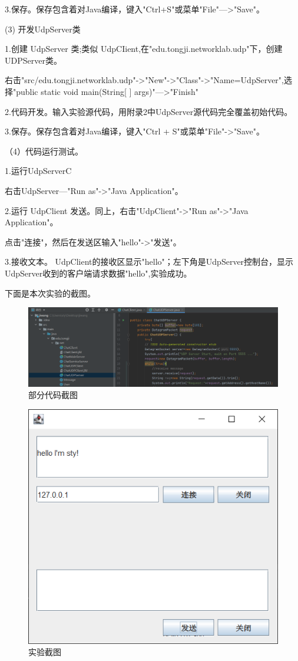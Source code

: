 \documentclass[lang=cn,11pt,a4paper,cite=authoryear]{elegantpaper}
\begin{document}
	3.保存。保存包含着对Java编译，键入"Ctrl+S"或菜单"File"—>"Save"。

(3)	开发UdpServer类

	1.创建 UdpServer 类;类似 UdpCIient,在"edu.tongji.networklab.udp"下，创建 UDPServer类。 

右击"src/edu.tongji.networklab.udp"->"New"->"Class"->"Name=UdpServer",选择"public static void main(String[ ] args)"—>"Finish"

	2.代码开发。输入实验源代码，用附录2中UdpServer源代码完全覆盖初始代码。

	3.保存。保存包含着对Java编译，键入"Ctrl + S"或菜单"File"->"Save"。

（4）代码运行测试。

	1.运行UdpServerC

右击UdpServer—"Run as"->"Java Application"。

	2.运行 UdpClient 发送。同上，右击"UdpClient"->"Run as"->"Java Application"。

点击"连接"，然后在发送区输入"hello"->"发送"。

	3.接收文本。
UdpClient的接收区显示"hello"；左下角是UdpServer控制台，显示UdpServer收到的客户端请求数据"hello",实验成功。

下面是本次实验的截图。

\begin{figure}[htbp]
	\centering
	\includegraphics[width=0.9\linewidth]{image/screenshot006}
	\caption{部分代码截图}
	\label{fig:screenshot006}
\end{figure}


\begin{figure}[htbp]
	\centering
	\includegraphics[width=0.7\linewidth]{image/screenshot005}
	\caption{实验截图}
	\label{fig:screenshot005}
\end{figure}
\end{document}
